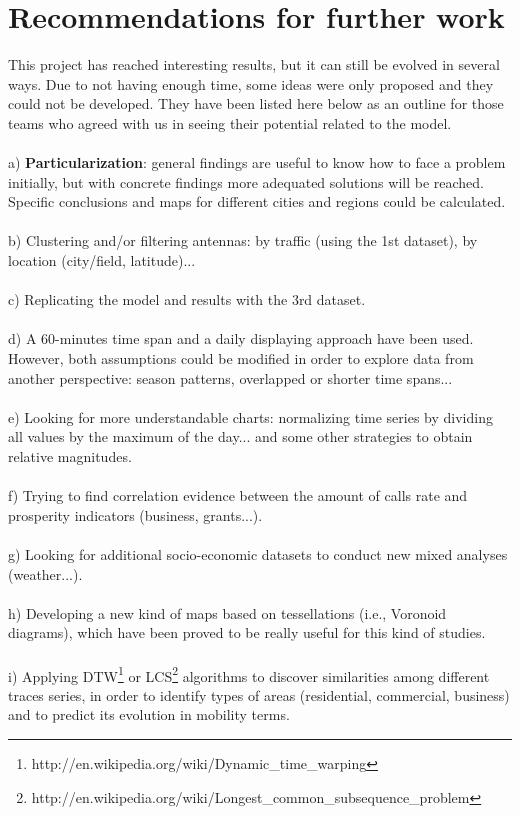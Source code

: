 \newpage
\section{Recommendations for further work}

This project has reached interesting results, but it can still be evolved in several ways. Due to not having enough time, some ideas were only proposed and they could not be developed. They have been listed here below as an outline for those teams who agreed with us in seeing their potential related to the model.
\\
\\
a) {\bf Particularization}: general findings are useful to know how to face a problem initially, but with concrete findings more adequated solutions will be reached. Specific conclusions and maps for different cities and regions could be calculated.
\\
\\
b) Clustering and/or filtering antennas: by traffic (using the 1st dataset), by location (city/field, latitude)...
\\
\\
c) Replicating the model and results with the 3rd dataset.
\\
\\
d) A 60-minutes time span and a daily displaying approach have been used. However, both assumptions could be modified in order to explore data from another perspective: season patterns, overlapped or shorter time spans...
\\
\\
e) Looking for more understandable charts: normalizing time series by dividing all values by the maximum of the day... and some other strategies to obtain relative magnitudes.
\\
\\
f) Trying to find correlation evidence between the amount of calls rate and prosperity indicators (business, grants...).
\\
\\
g) Looking for additional socio-economic datasets to conduct new mixed analyses (weather...).
\\
\\
h) Developing a new kind of maps based on tessellations (i.e., Voronoid diagrams), which have been proved to be really useful for this kind of studies.
\\
\\
i) Applying DTW\footnote{http://en.wikipedia.org/wiki/Dynamic\_time\_warping} or LCS\footnote{http://en.wikipedia.org/wiki/Longest\_common\_subsequence\_problem} algorithms to discover similarities among different traces series, in order to identify types of areas (residential, commercial, business) and to predict its evolution in mobility terms.
